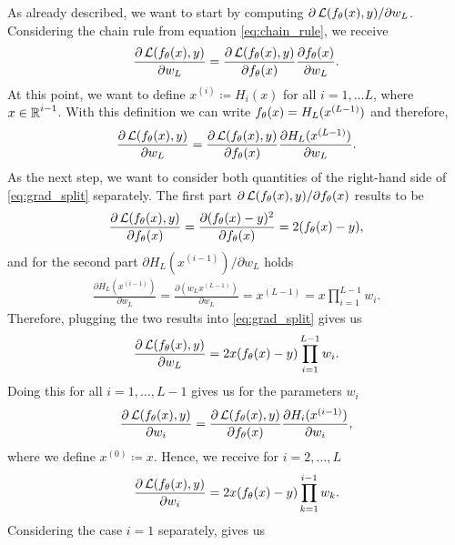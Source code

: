 \begin{example}
\begin{enumerate}
As already described, we want to start by computing $\partial \operatorname{\mathcal{L}} (f_{\theta}(x), y) / \partial w_L$. Considering the chain rule from equation \eqref{eq:chain_rule}, we receive
\begin{align*}
\frac{\partial \operatorname{\mathcal{L}} (f_{\theta}(x), y)}{ \partial w_L} = \frac{\partial \operatorname{\mathcal{L}} (f_{\theta}(x), y)}{\partial f_{\theta}(x)} \frac{\partial f_{\theta}(x)}{ \partial w_L}.
\end{align*}
At this point, we want to define $x^{(i)}\coloneqq H_i(x)$ for all $i=1,\ldots L$, where $x\in\operatorname{\mathbb{R}}^{i-1}$. With this definition we can write $f_{\theta}(x) = H_L(x^{(L-1)})$ and therefore,
\begin{align}\label{eq:grad_split}
\frac{\partial \operatorname{\mathcal{L}} (f_{\theta}(x), y)}{ \partial w_L} = \frac{\partial \operatorname{\mathcal{L}} (f_{\theta}(x), y)}{\partial f_{\theta}(x)} \frac{\partial H_L(x^{(L-1)})}{ \partial w_L}.
\end{align}
As the next step, we want to consider both quantities of the right-hand side of \eqref{eq:grad_split} separately. The first part $\partial \operatorname{\mathcal{L}} (f_{\theta}(x), y) / \partial f_{\theta}(x)$ results to be
\begin{align*}
\frac{\partial \operatorname{\mathcal{L}} (f_{\theta}(x), y)}{\partial f_{\theta}(x)} = \frac{\partial (f_{\theta}(x) - y)^2}{\partial f_{\theta}(x)} = 2 (f_{\theta}(x) - y),
\end{align*}
and for the second part $\partial H_L(x^{(i-1)}) /\partial w_L$ holds
\begin{align*}
\frac{\partial H_L(x^{(i-1)})}{ \partial w_L} = \frac{\partial \left(w_Lx^{(L-1)}\right)}{ \partial w_L} = x^{(L-1)} = x\prod_{i=1}^{L-1} w_i.
\end{align*}
Therefore, plugging the two results into \eqref{eq:grad_split} gives us
\begin{align*}
\frac{\partial \operatorname{\mathcal{L}} (f_{\theta}(x), y)}{ \partial w_L} = 2x (f_{\theta}(x) - y) \prod_{i=1}^{L-1} w_i.
\end{align*}
Doing this for all $i=1,\ldots, L-1$ gives us for the parameters $w_i$
\begin{align*}
\frac{\partial \operatorname{\mathcal{L}} (f_{\theta}(x), y)}{ \partial w_i} = \frac{\partial \operatorname{\mathcal{L}} (f_{\theta}(x), y)}{\partial f_{\theta}(x)} \frac{\partial H_i(x^{(i-1)})}{ \partial w_i},
\end{align*}
where we define $x^{(0)} \coloneqq x$. Hence, we receive for $i=2,\ldots,L$
\begin{align*}
\frac{\partial \operatorname{\mathcal{L}} (f_{\theta}(x), y)}{ \partial w_i} = 2x (f_{\theta}(x) - y) \prod_{k=1}^{i-1} w_k.
\end{align*}
Considering the case $i=1$ separately, gives us

\end{enumerate}
\end{example}
